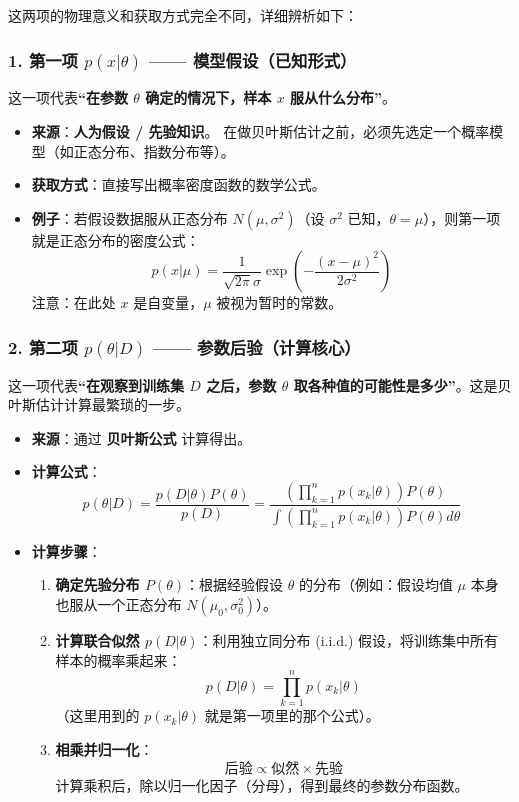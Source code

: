 \documentclass[a4paper, 11pt]{ctexart}
\begin{document}
这两项的物理意义和获取方式完全不同，详细辨析如下：

\subsubsection*{1. 第一项 $p(x|\theta)$ —— 模型假设（已知形式）}
这一项代表\textbf{“在参数 $\theta$ 确定的情况下，样本 $x$ 服从什么分布”}。

\begin{itemize}
    \item \textbf{来源}：\textbf{人为假设 / 先验知识}。
    在做贝叶斯估计之前，必须先选定一个概率模型（如正态分布、指数分布等）。
    \item \textbf{获取方式}：直接写出概率密度函数的数学公式。
    \item \textbf{例子}：若假设数据服从正态分布 $N(\mu, \sigma^2)$（设 $\sigma^2$ 已知，$\theta = \mu$），则第一项就是正态分布的密度公式：
    \begin{equation}
        p(x|\mu) = \frac{1}{\sqrt{2\pi}\sigma} \exp \left( -\frac{(x-\mu)^2}{2\sigma^2} \right)
    \end{equation}
    注意：在此处 $x$ 是自变量，$\mu$ 被视为暂时的常数。
\end{itemize}

\subsubsection*{2. 第二项 $p(\theta|D)$ —— 参数后验（计算核心）}
这一项代表\textbf{“在观察到训练集 $D$ 之后，参数 $\theta$ 取各种值的可能性是多少”}。这是贝叶斯估计计算最繁琐的一步。

\begin{itemize}
    \item \textbf{来源}：通过 \textbf{贝叶斯公式} 计算得出。
    \item \textbf{计算公式}：
    \begin{equation}
        p(\theta|D) = \frac{p(D|\theta)P(\theta)}{p(D)} = \frac{\left( \prod_{k=1}^n p(x_k|\theta) \right) P(\theta)}{\int \left( \prod_{k=1}^n p(x_k|\theta) \right) P(\theta) d\theta}
    \end{equation}
    \item \textbf{计算步骤}：
    \begin{enumerate}
        \item \textbf{确定先验分布 $P(\theta)$}：根据经验假设 $\theta$ 的分布（例如：假设均值 $\mu$ 本身也服从一个正态分布 $N(\mu_0, \sigma_0^2)$）。
        \item \textbf{计算联合似然 $p(D|\theta)$}：利用独立同分布 (i.i.d.) 假设，将训练集中所有样本的概率乘起来：
        \[ p(D|\theta) = \prod_{k=1}^n p(x_k|\theta) \]
        （这里用到的 $p(x_k|\theta)$ 就是第一项里的那个公式）。
        \item \textbf{相乘并归一化}：
        $$ \text{后验} \propto \text{似然} \times \text{先验} $$
        计算乘积后，除以归一化因子（分母），得到最终的参数分布函数。
    \end{enumerate}
\end{itemize}
\end{document}
